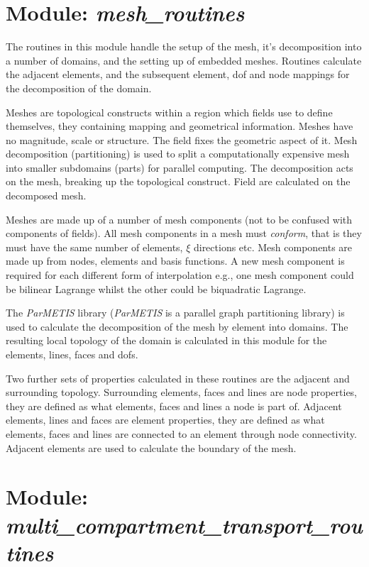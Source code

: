 \section{Module: \emph{mesh\_routines}}
\label{sec:meshroutines}

The routines in this module handle the setup of the mesh, it's decomposition 
into a number of domains, and the setting up of embedded meshes. Routines 
calculate the adjacent elements, and the subsequent element, dof and node 
mappings for the decomposition of the domain.

Meshes are topological constructs within a region which fields use to define
themselves, they containing mapping and geometrical information. Meshes have 
no magnitude, scale or structure. The field fixes the geometric aspect of it. 
Mesh decomposition (partitioning) is used to split a computationally 
expensive mesh into smaller subdomains (parts) for parallel computing. The 
decomposition acts on the mesh, breaking up the topological construct. Field 
are calculated on the decomposed mesh. 

Meshes are made up of a number of mesh components (not to be confused with 
components of fields). All mesh components in a mesh must \emph{conform}, that 
is they must have the same number of elements, $\xi$ directions etc. Mesh 
components are made up from nodes, elements and basis functions. A new mesh 
component is required for each different form of interpolation e.g., one mesh 
component could be bilinear Lagrange whilst the other could be biquadratic 
Lagrange.

The \emph{ParMETIS} library (\emph{ParMETIS} is a parallel graph partitioning 
library) is used to calculate the decomposition of the mesh by element into 
domains. The resulting local topology of the domain is calculated in this 
module for the elements, lines, faces and dofs.

Two further sets of properties calculated in these routines are the adjacent 
and surrounding topology. Surrounding elements, faces and lines are node 
properties, they are defined as what elements, faces and lines a node is part 
of. Adjacent elements, lines and faces are element properties, they are defined 
as what elements, faces and lines are connected to an element through node 
connectivity. Adjacent elements are used to calculate the boundary of the mesh.


\section{Module: \\ \emph{multi\_compartment\_transport\_routines}}
\label{sec:multicompartmenttransportroutines}

